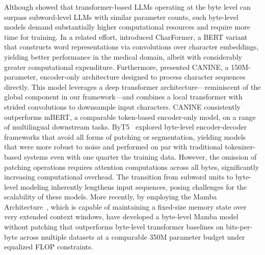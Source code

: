 Although \cite{Choe2019BridgingTG} showed that transformer-based LLMs operating at the byte level can surpass subword-level LLMs with similar parameter counts, such byte-level models demand substantially higher computational resources and require more time for training. In a related effort, \cite{el2020characterbert} introduced CharFormer, a BERT variant that constructs word representations via convolutions over character embeddings, yielding better performance in the medical domain, albeit with considerably greater computational expenditure. Furthermore, \cite{clark2022canine} presented CANINE, a 150M-parameter, encoder-only architecture designed to process character sequences directly. This model leverages a deep transformer architecture—reminiscent of the global component in our framework—and combines a local transformer with strided convolutions to downsample input characters. CANINE consistently outperforms mBERT, a comparable token-based encoder-only model, on a range of multilingual downstream tasks. ByT5~\citep{xue2022byt5} explored byte-level encoder-decoder frameworks that avoid all forms of patching or segmentation, yielding models that were more robust to noise and performed on par with traditional tokenizer-based systems even with one quarter the training data. However, the omission of patching operations requires attention computations across all bytes, significantly increasing computational overhead. The transition from subword units to byte-level modeling inherently lengthens input sequences, posing challenges for the scalability of these models. More recently, by employing the Mamba Architecture~\citep{gu2023mamba}, which is capable of maintaining a fixed-size memory state over very extended context windows, \cite{wang2024mambabyte} have developed a byte-level Mamba model without patching that outperforms byte-level transformer baselines on bits-per-byte across multiple datasets at a comparable 350M parameter budget under equalized FLOP constraints.

